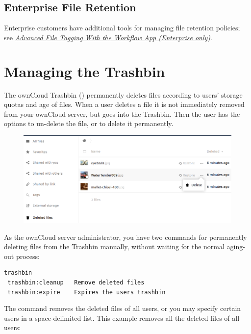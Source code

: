 \documentclass[letterpaper,10pt,english]{sphinxmanual}
\begin{document}
\subsection{Enterprise File Retention}
\label{configuration_files/file_versioning:enterprise-file-retention}
Enterprise customers have additional tools for managing file retention
policies; see {\hyperref[enterprise_file_management/files_tagging::doc]{\emph{Advanced File Tagging With the Workflow App (Enterprise only)}}}.


\section{Managing the Trashbin}
\label{configuration_files/trashbin_options::doc}\label{configuration_files/trashbin_options:managing-the-trashbin}
The ownCloud Trashbin () permanently deletes files according to users' storage quotas and age of files. When a user deletes a file it is not immediately removed from your ownCloud server, but goes into the Trashbin. Then the user has the options to un-delete the file, or to delete it permanently.
\begin{figure}[htbp]
\centering

\includegraphics{trashbin-1.png}
\end{figure}

As the ownCloud server administrator, you have two  commands for permanently deleting files from the Trashbin manually, without waiting for the normal aging-out process:

\begin{Verbatim}[commandchars=\\\{\}]
trashbin
 trashbin:cleanup   Remove deleted files
 trashbin:expire    Expires the users trashbin
\end{Verbatim}

The  command removes the deleted files of all users, or you may specify certain users in a space-delimited list. This example removes all the deleted files of all users:
\end{document}
